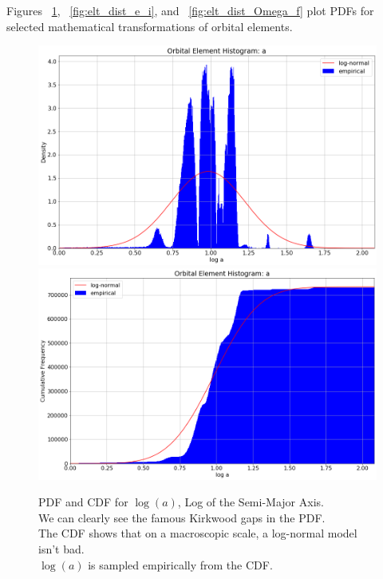 Figures ~\ref{fig:elt_dist_a}, ~\ref{fig:elt_dist_e_i}, and ~\ref{fig:elt_dist_Omega_f} plot PDFs 
for selected mathematical transformations of orbital elements.
\begin{figure}[hbt!]
\begin{center}
\includegraphics[width=1.0\textwidth]{../figs/elts/elt_hist_a_pdf.png}
\includegraphics[width=1.0\textwidth]{../figs/elts/elt_hist_a_cdf.png}
\end{center}
\caption[PDF and CDF for $\log(a)$, Log of the Semi-Major Axis.]
{PDF and CDF for $\log(a)$, Log of the Semi-Major Axis.\\
We can clearly see the famous Kirkwood gaps in the PDF. \\
The CDF shows that on a macroscopic scale, a log-normal model isn't bad.\\
$\log(a)$ is sampled empirically from the CDF.}
\label{fig:elt_dist_a}
\end{figure}
\clearpage

